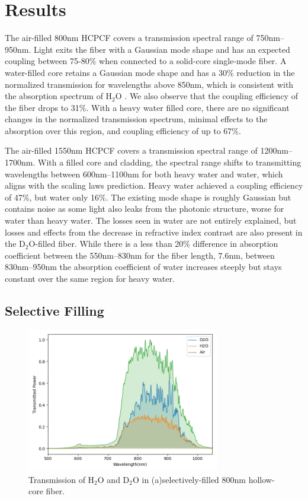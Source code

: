 \section{Results}
The air-filled 800nm HCPCF covers a transmission spectral range of 750nm–950nm. Light exits the fiber with a Gaussian mode shape and has an expected coupling between 75-80\% when connected to a solid-core single-mode fiber. A water-filled core retains a Gaussian mode shape and has a 30\% reduction in the normalized transmission for wavelengths above 850nm, which is consistent with the absorption spectrum of H${}_2$O \cite{kedenburg}. We also observe that the coupling efficiency of the fiber drops to 31\%. With a heavy water filled core, there are no significant changes in the normalized transmission spectrum, minimal effects to the absorption over this region, and coupling efficiency of up to 67\%.

The air-filled 1550nm HCPCF covers a transmission spectral range of 1200nm–1700nm. With a filled core and cladding, the spectral range shifts to transmitting wavelengths between 600nm–1100nm for both heavy water and water, which aligns with the scaling laws prediction. Heavy water achieved a coupling efficiency of 47\%, but water only 16\%. The existing mode shape is roughly Gaussian but contains noise as some light also leaks from the photonic structure, worse for water than heavy water. The losses seen in water are not entirely explained, but losses and effects from the decrease in refractive index contrast are also present in the D${}_2$O-filled fiber. While there is a less than 20\% difference in absorption coefficient between the 550nm–830nm for the fiber length, 7.6nm, between 830nm–950nm the absorption coefficient of water increases steeply but stays constant over the same region for heavy water.
\subsection{Selective Filling}
\begin{figure}[!htb]
	\centering
	\includegraphics[width=0.75\textwidth]{./Figures/fiberfilling/HC800/transmission.png}
	\caption{Transmission of H${}_2$O and D${}_2$O in (a)selectively-filled 800nm hollow-core fiber.}
	\label{fig:trans 800hc}
\end{figure}
\clearpage

